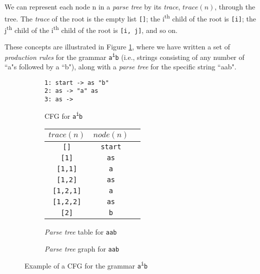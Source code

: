 \begin{definition}
We can represent each node n in a \textit{parse tree} by its \textit{trace}, $trace(n)$, through the tree. The \textit{trace} of the root is the empty list \texttt{[]}; the i\textsuperscript{th} child of the root is \texttt{[i]}; the j\textsuperscript{th} child of the i\textsuperscript{th} child of the root is \texttt{[i, j]}, and so on.
\end{definition}

\noindent
These concepts are illustrated in Figure \ref{fig:cfg_parse_tree_example}, where we have written a set of \textit{production rules} for the grammar \texttt{a\textsuperscript{i}b} (i.e., strings consisting of any number of ``a"s followed by a ``b"), along with a \textit{parse tree} for the specific string ``aab".

\begin{figure}[H]
\begin{subfigure}{0.3\textwidth}
\texttt{1: start -> as "b" \\ 2: as -> "a" as \\ 3: as ->\\}
\caption{CFG for \texttt{a\textsuperscript{i}b}}
\end{subfigure}
\begin{subfigure}{0.34\textwidth}
\begin{table}[H]
\centering
\begin{tabular}{@{}ccc@{}}
\toprule
\textbf{$trace(n)$} & \textbf{$node(n)$} \\ \midrule
\texttt{[]} & \texttt{start} \\
\texttt{[1]} & \texttt{as} \\
\texttt{[1,1]} & \texttt{a} \\
\texttt{[1,2]} & \texttt{as} \\
\texttt{[1,2,1]} & \texttt{a} \\
\texttt{[1,2,2]} & \texttt{as} \\
\texttt{[2]} & \texttt{b} \\ \bottomrule
\end{tabular}
\end{table}
\caption{\textit{Parse tree} table for \texttt{aab}}
\end{subfigure}
\begin{subfigure}{0.34\textwidth}
\centering
{}
\caption{\textit{Parse tree} graph for \texttt{aab}}
\end{subfigure}
\caption{Example of a CFG for the grammar \texttt{a\textsuperscript{i}b}}
\label{fig:cfg_parse_tree_example}
\end{figure}

